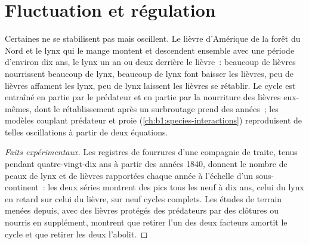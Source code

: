 \section{Fluctuation et régulation}

\begin{proposition}\label{prop:b1:populations:cycles}
Certaines  ne se stabilisent pas mais oscillent. Le lièvre
d'Amérique de la forêt du Nord et le lynx qui le mange montent et
descendent ensemble avec une période d'environ dix ans, le lynx un an
ou deux derrière le lièvre~: beaucoup de lièvres nourrissent beaucoup de
lynx, beaucoup de lynx font baisser les lièvres, peu de lièvres
affament les lynx, peu de lynx laissent les lièvres se rétablir. Le
cycle est entraîné en partie par le prédateur et en partie par la
nourriture des lièvres eux-mêmes, dont le rétablissement après un
surbroutage prend des années~; les modèles couplant prédateur et proie
(\cref{ch:b1:species-interactions}) reproduisent de telles oscillations
à partir de deux équations.
\end{proposition}
\begin{proof}[Faits expérimentaux]
Les registres de fourrures d'une compagnie de traite, tenus pendant
quatre-vingt-dix ans à partir des années 1840, donnent le nombre de
peaux de lynx et de lièvres rapportées chaque année à l'échelle d'un
sous-continent~: les deux séries montrent des pics tous les neuf à dix
ans, celui du lynx en retard sur celui du lièvre, sur neuf cycles
complets. Les études de terrain menées depuis, avec des lièvres
protégés des prédateurs par des clôtures ou nourris en supplément,
montrent que retirer l'un des deux facteurs amortit le cycle et que
retirer les deux l'abolit.
\end{proof}

